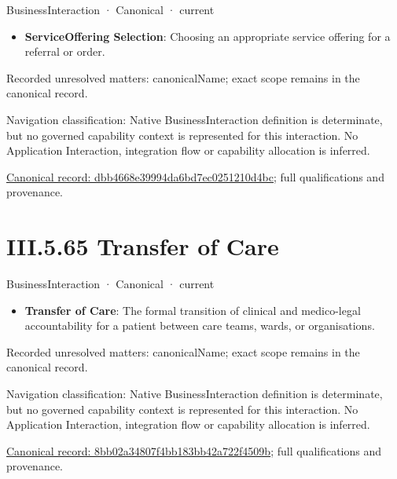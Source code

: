 \label{element:dbb4668e39994da6bd7ec0251210d4bc}
{\small BusinessInteraction · Canonical · current}\par

\begin{itemize}


\item \textbf{ServiceOffering Selection}: Choosing an appropriate service offering for a referral or order.

\end{itemize}

{\small Recorded unresolved matters: canonicalName; exact scope remains in the canonical record.}\par
{\small Navigation classification: Native BusinessInteraction definition is determinate, but no governed capability context is represented for this interaction. No Application Interaction, integration flow or capability allocation is inferred.}\par
{\footnotesize \href{../../../../continuum/business/business-interaction/dbb4668e39994da6bd7ec0251210d4bc.md}{Canonical record: dbb4668e39994da6bd7ec0251210d4bc}; full qualifications and provenance.}\par
\section*{III.5.65 Transfer of Care}
\label{navigation:III.5.65}

\label{element:8bb02a34807f4bb183bb42a722f4509b}
{\small BusinessInteraction · Canonical · current}\par

\begin{itemize}


\item \textbf{Transfer of Care}: The formal transition of clinical and medico-legal accountability for a patient between care teams, wards, or organisations.

\end{itemize}

{\small Recorded unresolved matters: canonicalName; exact scope remains in the canonical record.}\par
{\small Navigation classification: Native BusinessInteraction definition is determinate, but no governed capability context is represented for this interaction. No Application Interaction, integration flow or capability allocation is inferred.}\par
{\footnotesize \href{../../../../continuum/business/business-interaction/8bb02a34807f4bb183bb42a722f4509b.md}{Canonical record: 8bb02a34807f4bb183bb42a722f4509b}; full qualifications and provenance.}\par
